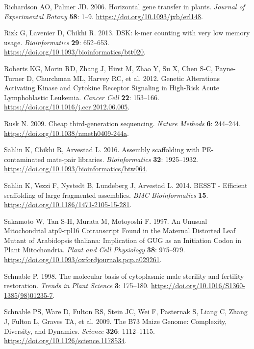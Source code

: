 \documentclass[
  12pt,
  oneside,
  openany]{book}
\begin{document}
\leavevmode\hypertarget{ref-Richardson_2006}{}%
Richardson AO, Palmer JD. 2006. Horizontal gene transfer in plants. \emph{Journal of Experimental Botany} \textbf{58}: 1--9. \url{https://doi.org/10.1093/jxb/erl148}.

\leavevmode\hypertarget{ref-Rizk_2013}{}%
Rizk G, Lavenier D, Chikhi R. 2013. DSK: k-mer counting with very low memory usage. \emph{Bioinformatics} \textbf{29}: 652--653. \url{https://doi.org/10.1093/bioinformatics/btt020}.

\leavevmode\hypertarget{ref-Roberts_2012}{}%
Roberts KG, Morin RD, Zhang J, Hirst M, Zhao Y, Su X, Chen S-C, Payne-Turner D, Churchman ML, Harvey RC, et al. 2012. Genetic Alterations Activating Kinase and Cytokine Receptor Signaling in High-Risk Acute Lymphoblastic Leukemia. \emph{Cancer Cell} \textbf{22}: 153--166. \url{https://doi.org/10.1016/j.ccr.2012.06.005}.

\leavevmode\hypertarget{ref-Rusk_2009}{}%
Rusk N. 2009. Cheap third-generation sequencing. \emph{Nature Methods} \textbf{6}: 244--244. \url{https://doi.org/10.1038/nmeth0409-244a}.

\leavevmode\hypertarget{ref-Sahlin_2016}{}%
Sahlin K, Chikhi R, Arvestad L. 2016. Assembly scaffolding with PE-contaminated mate-pair libraries. \emph{Bioinformatics} \textbf{32}: 1925--1932. \url{https://doi.org/10.1093/bioinformatics/btw064}.

\leavevmode\hypertarget{ref-Sahlin_2014}{}%
Sahlin K, Vezzi F, Nystedt B, Lundeberg J, Arvestad L. 2014. BESST - Efficient scaffolding of large fragmented assemblies. \emph{BMC Bioinformatics} \textbf{15}. \url{https://doi.org/10.1186/1471-2105-15-281}.

\leavevmode\hypertarget{ref-Sakamoto_1997}{}%
Sakamoto W, Tan S-H, Murata M, Motoyoshi F. 1997. An Unusual Mitochondrial atp9-rpl16 Cotranscript Found in the Maternal Distorted Leaf Mutant of Arabidopsis thaliana: Implication of GUG as an Initiation Codon in Plant Mitochondria. \emph{Plant and Cell Physiology} \textbf{38}: 975--979. \url{https://doi.org/10.1093/oxfordjournals.pcp.a029261}.

\leavevmode\hypertarget{ref-Schnable_1998}{}%
Schnable P. 1998. The molecular basis of cytoplasmic male sterility and fertility restoration. \emph{Trends in Plant Science} \textbf{3}: 175--180. \url{https://doi.org/10.1016/S1360-1385(98)01235-7}.

\leavevmode\hypertarget{ref-Schnable_2009}{}%
Schnable PS, Ware D, Fulton RS, Stein JC, Wei F, Pasternak S, Liang C, Zhang J, Fulton L, Graves TA, et al. 2009. The B73 Maize Genome: Complexity, Diversity, and Dynamics. \emph{Science} \textbf{326}: 1112--1115. \url{https://doi.org/10.1126/science.1178534}.
\end{document}
